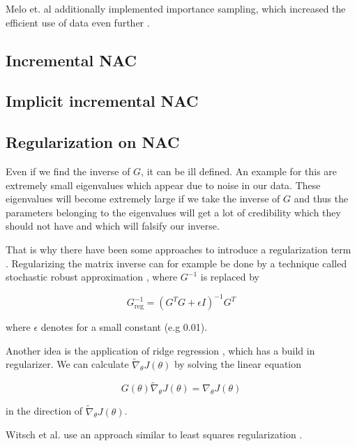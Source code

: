 Melo et. al additionally implemented importance sampling, which increased the efficient use of data even further \cite{melo2008fitted}.

\subsection{Incremental NAC}

\subsection{Implicit incremental NAC}

\subsection{Regularization on NAC}
	Even if we find the inverse of $G$, it can be ill defined. An example for this are extremely small eigenvalues which appear due to noise in our data. These eigenvalues will become extremely large if we take the inverse of $G$ and thus the parameters belonging to the eigenvalues will get a lot of credibility which they should not have and which will falsify our inverse.
	
	That is why there have been some approaches to introduce a regularization term \cite{sohl2012natural}. Regularizing the matrix inverse can for example be done by a technique called stochastic robust approximation \cite{boyd2004convex}, where $G^{-1}$ is replaced by 
	
	\begin{equation}
		G^{-1}_{\text{reg}} = \left( G^T G + \epsilon I \right)^{-1} G^T
	\end{equation}
	
	\noindent where $\epsilon$ denotes for a small constant (e.g 0.01).
	
	Another idea is the application of ridge regression \cite{hoerl1970ridge}, which has a build in regularizer. We can calculate $\widetilde{\nabla}_{\theta} J(\theta)$ by solving the linear equation
	
	\begin{equation}
		G(\theta) \widetilde{\nabla}_{\theta} J(\theta) = \nabla_{\theta} J(\theta)
	\end{equation}
	
	\noindent in the direction of $\widetilde{\nabla}_{\theta} J(\theta)$.
	
	Witsch et al. use an approach similar to least squares regularization \cite{witsch2011enhancing}. 
	
